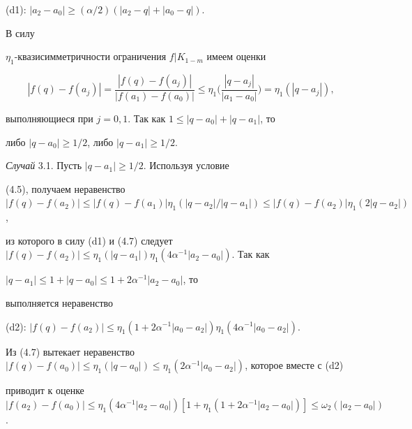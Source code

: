 \begin{pf}
(d1): $|a_2-a_0| \geq (\alpha/2)(|a_2-q|+|a_0-q|)$.





\noindent{}В силу 


$\eta_1$-{}квазисимметричности ограничения $f|K_{1-m}$ имеем оценки 


\begin{equation}


|f(q)-f(a_j)|=\frac{|f(q)-f(a_j)|}{|f(a_1)-f(a_0)|} \leq 


\eta_1\bigg( \frac{|q-a_j|}{|a_1-a_0|} \bigg)=\eta_1(|q-a_j|), 


\end{equation}


выполняющиеся при $j=0,1$. Так как $1 \leq |q -a_0|+|q-a_1|$, то 


либо $|q-a_0| \geq 1/2$, либо $|q-a_1| \geq 1/2$.





{\it Случай} 3.1. Пусть $|q-a_1| \geq 1/2$. Используя условие 


(4.5), получаем неравенство $|f(q)-f(a_2)| \leq |f(q)-f(a_1)|


\eta_1(|q-a_2|/|q-a_1|) \leq |f(q)-f(a_2)| \eta_1(2|q-a_2|)$, 


из которого в силу (d1) и (4.7) следует $|f(q)-f(a_2)| \leq 


\eta_1(|q-a_1|) \eta_1(4\alpha^{-1}|a_2-a_0|)$. Так как 


$|q-a_1| \leq 1+|q-a_0| \leq 1+2\alpha^{-1}|a_2-a_0|$, то 


выполняется неравенство





(d2): $|f(q)-f(a_2)| \leq \eta_1(1+


2\alpha^{-1}|a_0-a_2|) \eta_1(4\alpha^{-1}|a_0-a_2|)$. 





\noindent{}Из (4.7) вытекает неравенство $|f(q)-f(a_0)| \leq \eta_1(|q-a_0|) 


\leq \eta_1(2\alpha^{-1}|a_0-a_2|)$, которое вместе с (d2) 


приводит к оценке $|f(a_2)-f(a_0)| \leq \eta_1(4\alpha^{-1} 


|a_2-a_0|) [1+\eta_1(1+2\alpha^{-1}|a_2-a_0|)] \leq 


\omega_2(|a_2-a_0|)$. 






\end{pf}
